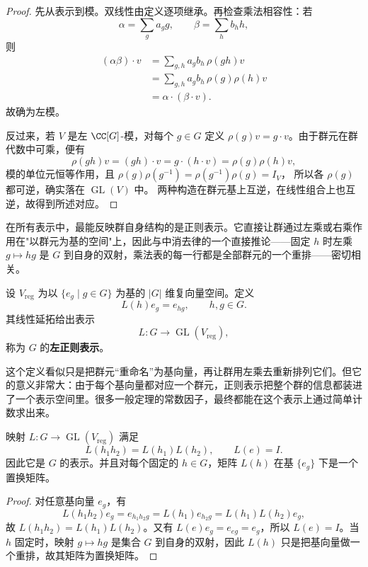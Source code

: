 \begin{proof}
先从表示到模。双线性由定义逐项继承。再检查乘法相容性：若
\[
\alpha=\sum_g a_g g,
\qquad
\beta=\sum_h b_h h,
\]
则
\begin{align*}
(\alpha\beta)\cdot v
&=\sum_{g,h}a_g b_h\,\rho(gh)v\\
&=\sum_{g,h}a_g b_h\,\rho(g)\rho(h)v\\
&=\alpha\cdot(\beta\cdot v).
\end{align*}
故确为左模。

反过来，若 $V$ 是左 $\CC[G]$-模，对每个 $g\in G$ 定义 $\rho(g)v=g\cdot v$。由于群元在群代数中可乘，便有
\[
\rho(gh)v=(gh)\cdot v=g\cdot(h\cdot v)=\rho(g)\rho(h)v,
\]
模的单位元恒等作用，且 $\rho(g)\rho(g^{-1})=\rho(g^{-1})\rho(g)=I_V$，
所以各 $\rho(g)$ 都可逆，确实落在 $\operatorname{GL}(V)$ 中。
两种构造在群元基上互逆，在线性组合上也互逆，故得到所述对应。
\end{proof}

在所有表示中，最能反映群自身结构的是正则表示。它直接让群通过左乘或右乘作用在"以群元为基的空间"上，因此与中消去律的一个直接推论——固定 $h$ 时左乘 $g\mapsto hg$ 是 $G$ 到自身的双射，乘法表的每一行都是全部群元的一个重排——密切相关。

\begin{definition}[左正则表示]
设 $V_{\mathrm{reg}}$ 为以 $\{e_g\mid g\in G\}$ 为基的 $|G|$ 维复向量空间。定义
\[
L(h)e_g=e_{hg},
\qquad h,g\in G.
\]
其线性延拓给出表示
\[
L:G\to \operatorname{GL}(V_{\mathrm{reg}}),
\]
称为 $G$ 的\textbf{左正则表示}。
\label{def:left-regular-representation}
\end{definition}

这个定义看似只是把群元“重命名”为基向量，再让群用左乘去重新排列它们。但它的意义非常大：由于每个基向量都对应一个群元，正则表示把整个群的信息都装进了一个表示空间里。很多一般定理的常数因子，最终都能在这个表示上通过简单计数求出来。

\begin{proposition}[左正则表示确为表示]
映射 $L:G\to\operatorname{GL}(V_{\mathrm{reg}})$ 满足
\[
L(h_1h_2)=L(h_1)L(h_2),
\qquad
L(e)=I.
\]
因此它是 $G$ 的表示。并且对每个固定的 $h\in G$，矩阵 $L(h)$ 在基 $\{e_g\}$ 下是一个置换矩阵。
\label{prop:left-regular-is-representation}

\end{proposition}

\begin{proof}
对任意基向量 $e_g$，有
\[
L(h_1h_2)e_g=e_{h_1h_2g}=L(h_1)e_{h_2g}=L(h_1)L(h_2)e_g,
\]
故 $L(h_1h_2)=L(h_1)L(h_2)$。又有 $L(e)e_g=e_{eg}=e_g$，所以 $L(e)=I$。当 $h$ 固定时，映射 $g\mapsto hg$ 是集合 $G$ 到自身的双射，因此 $L(h)$ 只是把基向量做一个重排，故其矩阵为置换矩阵。
\end{proof}

